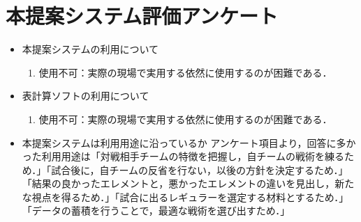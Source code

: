 \documentclass[shuuron]{kuee}
\begin{document}
\chapter{本提案システム評価アンケート}
	\begin{itemize}
		\item 本提案システムの利用について
			\begin{enumerate}
				\item 使用不可：実際の現場で実用する依然に使用するのが困難である．

			\end{enumerate}
		\item 表計算ソフトの利用について
			\begin{enumerate}
				\item 使用不可：実際の現場で実用する依然に使用するのが困難である．

			\end{enumerate}
		\item 本提案システムは利用用途に沿っているか
			アンケート項目より，回答に多かった利用用途は「対戦相手チームの特徴を把握し，自チームの戦術を練るため．」「試合後に，自チームの反省を行ない，以後の方針を決定するため．」「結果の良かったエレメントと，悪かったエレメントの違いを見出し，新たな視点を得るため．」「試合に出るレギュラーを選定する材料とするため．」「データの蓄積を行うことで，最適な戦術を選び出すため．」

	\end{itemize}


\end{document}
